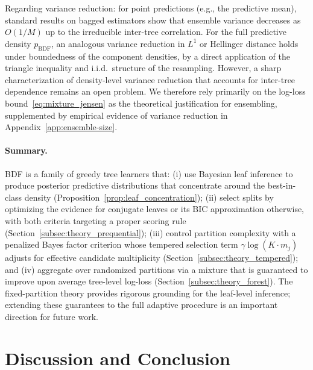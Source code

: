 \documentclass[twoside,11pt]{article}
\begin{document}
Regarding variance reduction: for point predictions (e.g., the predictive mean), standard results on bagged estimators \citep{mentch2016quantifying} show that ensemble variance decreases as $O(1/M)$ up to the irreducible inter-tree correlation. For the full predictive density $p_{\mathrm{BDF}}$, an analogous variance reduction in $L^1$ or Hellinger distance holds under boundedness of the component densities, by a direct application of the triangle inequality and i.i.d.\ structure of the resampling. However, a sharp characterization of density-level variance reduction that accounts for inter-tree dependence remains an open problem. We therefore rely primarily on the log-loss bound~\eqref{eq:mixture_jensen} as the theoretical justification for ensembling, supplemented by empirical evidence of variance reduction in Appendix~\ref{app:ensemble-size}.

\paragraph{Summary.}
BDF is a family of greedy tree learners that:
(i) use Bayesian leaf inference to produce posterior predictive distributions that concentrate around the best-in-class density (Proposition~\ref{prop:leaf_concentration});
(ii) select splits by optimizing the evidence for conjugate leaves or its BIC approximation otherwise, with both criteria targeting a proper scoring rule (Section~\ref{subsec:theory_prequential});
(iii) control partition complexity with a penalized Bayes factor criterion whose tempered selection term $\gamma\log(K \cdot m_j)$ adjusts for effective candidate multiplicity (Section~\ref{subsec:theory_tempered}); and
(iv) aggregate over randomized partitions via a mixture that is guaranteed to improve upon average tree-level log-loss (Section~\ref{subsec:theory_forest}).
The fixed-partition theory provides rigorous grounding for the leaf-level inference; extending these guarantees to the full adaptive procedure is an important direction for future work.



\section{Discussion and Conclusion}\label{sec:discussion}
\end{document}
